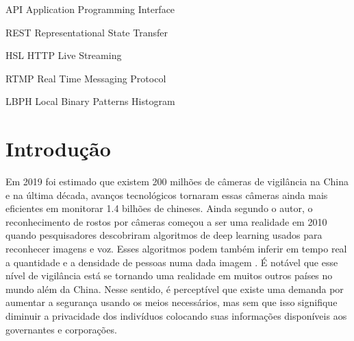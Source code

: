 \documentclass[12pt, %
openright, 
oneside, %
a4paper,    %
brazil]{facom-ufu-abntex2}
\begin{document}
\begin{siglas} %
  \item[API] Application Programming Interface
  \item[REST] Representational State Transfer
  \item[HSL] HTTP Live Streaming
  \item[RTMP] Real Time Messaging Protocol 
  \item[LBPH] Local Binary Patterns Histogram 
\end{siglas}


\tableofcontents*
\cleardoublepage





\textual



\chapter[Introdução]{Introdução}
Em 2019 foi estimado que existem 200 milhões de câmeras de vigilância na China e na última década,
avanços tecnológicos tornaram essas câmeras ainda mais eficientes em monitorar 1.4 bilhões de chineses. 
Ainda segundo o autor, o reconhecimento de rostos por câmeras começou a ser uma realidade em 2010 quando pesquisadores 
descobriram algoritmos de deep learning usados para reconhecer imagens e voz. Esses algoritmos podem
também inferir em tempo real a quantidade e a densidade de pessoas numa dada imagem
\cite{qiang2019road}. É notável que esse nível de vigilância está se tornando uma realidade em muitos outros
países no mundo além da China. Nesse sentido, é perceptível que existe uma demanda por aumentar a segurança usando os meios 
necessários, mas sem que isso signifique diminuir a privacidade dos indivíduos colocando suas informações disponíveis aos 
governantes e corporações.
\end{document}
